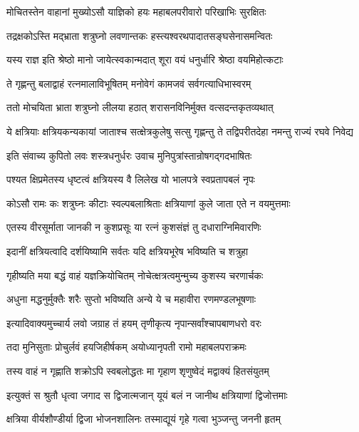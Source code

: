 \twolineshloka
{मोचितस्तेन वाहानां मुख्योऽसौ याज्ञिको हयः}
{महाबलपरीवारो परिखाभिः सुरक्षितः}%

\twolineshloka
{तद्रक्षकोऽस्ति मद्भ्राता शत्रुघ्नो लवणान्तकः}
{हस्त्यश्वरथपादातसङ्घसेनासमन्वितः}%

\twolineshloka
{यस्य राज्ञ इति श्रेष्ठो मानो जायेत्स्वकान्मदात्}
{शूरा वयं धनुर्धारि श्रेष्ठा वयमिहोत्कटाः}%

\twolineshloka
{ते गृह्णन्तु बलाद्वाहं रत्नमालाविभूषितम्}
{मनोवेगं कामजवं सर्वगत्याधिभास्वरम्}%

\twolineshloka
{ततो मोचयिता भ्राता शत्रुघ्नो लीलया हठात्}
{शरासनविनिर्मुक्त वत्सदन्तकृतव्यथात्}%

\fourlineindentedshloka
{ये क्षत्रियाः क्षत्रियकन्यकायां}
{जाताश्च सत्क्षेत्रकुलेषु सत्सु}
{गृह्णन्तु ते तद्विपरीतदेहा}
{नमन्तु राज्यं रघवे निवेद्य}%

\twolineshloka
{इति संवाच्य कुपितो लवः शस्त्रधनुर्धरः}
{उवाच मुनिपुत्रांस्तान्रोषगद्गदभाषितः}%

\twolineshloka
{पश्यत क्षिप्रमेतस्य धृष्टत्वं क्षत्रियस्य वै}
{लिलेख यो भालपत्रे स्वप्रतापबलं नृपः}%

\twolineshloka
{कोऽसौ रामः कः शत्रुघ्नः कीटाः स्वल्पबलाश्रिताः}
{क्षत्रियाणां कुले जाता एते न वयमुत्तमाः}%

\twolineshloka
{एतस्य वीरसूर्माता जानकी न कुशप्रसूः}
{या रत्नं कुशसंज्ञं तु दधाराग्निमिवारणिः}%

\twolineshloka
{इदानीं क्षत्रियत्वादि दर्शयिष्यामि सर्वतः}
{यदि क्षत्रियभूरेष भविष्यति च शत्रुहा}%

\twolineshloka
{गृहीष्यति मया बद्धं वाहं यज्ञक्रियोचितम्}
{नोचेत्क्षत्रत्वमुन्मुच्य कुशस्य चरणार्चकः}%

\twolineshloka
{अधुना मद्धनुर्मुक्तैः शरैः सुप्तो भविष्यति}
{अन्ये ये च महावीरा रणमण्डलभूषणाः}%

\twolineshloka
{इत्यादिवाक्यमुच्चार्य लवो जग्राह तं हयम्}
{तृणीकृत्य नृपान्सर्वांश्चापबाणधरो वरः}%

\twolineshloka
{तदा मुनिसुताः प्रोचुर्लवं हयजिहीर्षकम्}
{अयोध्यानृपती रामो महाबलपराक्रमः}%

\twolineshloka
{तस्य वाहं न गृह्णाति शक्रोऽपि स्वबलोद्धतः}
{मा गृहाण शृणुष्वेदं मद्वाक्यं हितसंयुतम्}%

\twolineshloka
{इत्युक्तं स श्रुतौ धृत्वा जगाद स द्विजात्मजान्}
{यूयं बलं न जानीथ क्षत्रियाणां द्विजोत्तमाः}%

\twolineshloka
{क्षत्रिया वीर्यशौण्डीर्या द्विजा भोजनशालिनः}
{तस्माद्यूयं गृहे गत्वा भुञ्जन्तु जननी हृतम्}%

